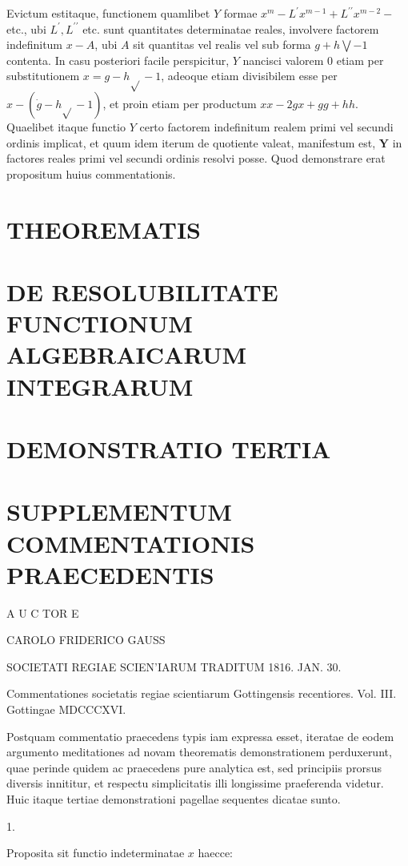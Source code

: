 \documentclass[10pt]{article}
\begin{document}
Evictum estitaque, functionem quamlibet \(Y\) formae \(x^{m}-L^{\prime} x^{m-1}+L^{\prime \prime} x^{m-2}-\) etc., ubi \(L^{\prime}, L^{\prime \prime}\) etc. sunt quantitates determinatae reales, involvere factorem indefinitum \(x-A\), ubi \(A\) sit quantitas vel realis vel sub forma \(g+h \bigvee-1\) contenta. In casu posteriori facile perspicitur, \(Y\) nancisci valorem 0 etiam per substitutionem \(x=g-h \sqrt{ }-1\), adeoque etiam divisibilem esse per \(x-(\dot{g}-h \sqrt{ }-1)\), et proin etiam per productum \(x x-2 g x+g g+h h\). Quaelibet itaque functio \(Y\) certo factorem indefinitum realem primi vel secundi ordinis implicat, et quum idem iterum de quotiente valeat, manifestum est, \(\boldsymbol{Y}\) in factores reales primi vel secundi ordinis resolvi posse. Quod demonstrare erat propositum huius commentationis.

\section*{THEOREMATIS }
\section*{DE RESOLUBILITATE FUNCTIONUM ALGEBRAICARUM INTEGRARUM}


\section*{DEMONSTRATIO TERTIA}
\section*{SUPPLEMENTUM COMMENTATIONIS PRAECEDENTIS}
A U C TOR E

CAROLO FRIDERICO GAUSS

SOCIETATI REGIAE SCIEN'IARUM TRADITUM 1816. JAN. 30.

Commentationes societatis regiae scientiarum Gottingensis recentiores. Vol. III. Gottingae MDCCCXVI.

Postquam commentatio praecedens typis iam expressa esset, iteratae de eodem argumento meditationes ad novam theorematis demonstrationem perduxerunt, quae perinde quidem ac praecedens pure analytica est, sed principiis prorsus diversis innititur, et respectu simplicitatis illi longissime praeferenda videtur. Huic itaque tertiae demonstrationi pagellae sequentes dicatae sunto.

1.

Proposita sit functio indeterminatae \(x\) haecce:
\end{document}

